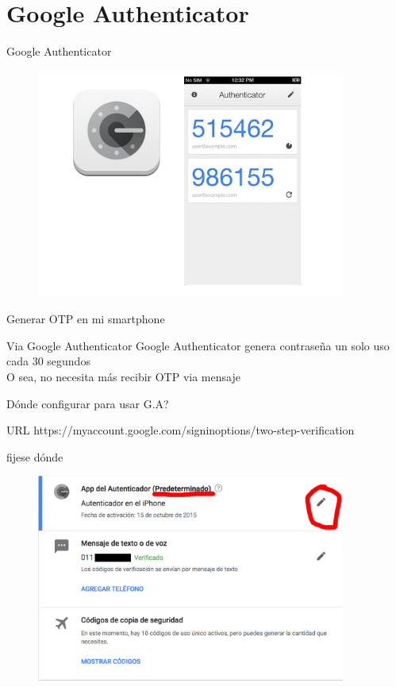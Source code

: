 \documentclass[11pt]{beamer}
\begin{document}
\section{Google Authenticator}
\begin{frame}{Google Authenticator}
  \begin{figure}
    \includegraphics[width=4in]{google-authenticator.jpg}
  \end{figure}
\end{frame}
\begin{frame}{Generar OTP en mi smartphone}
  \begin{block}{Via Google Authenticator}
    Google Authenticator genera contrase\~na un solo uso cada 30 segundos\\
    O sea, no necesita m\'as recibir OTP via mensaje
  \end{block}
\end{frame}
\begin{frame}{D\'onde configurar para usar G.A?}
  \begin{block}{URL}
    https://myaccount.google.com/signinoptions/two-step-verification
  \end{block}
\end{frame}
\begin{frame}{fijese d\'onde}
  \begin{figure}
    \includegraphics[width=4in]{2wayauth.png}
  \end{figure}
\end{frame}
\end{document}

